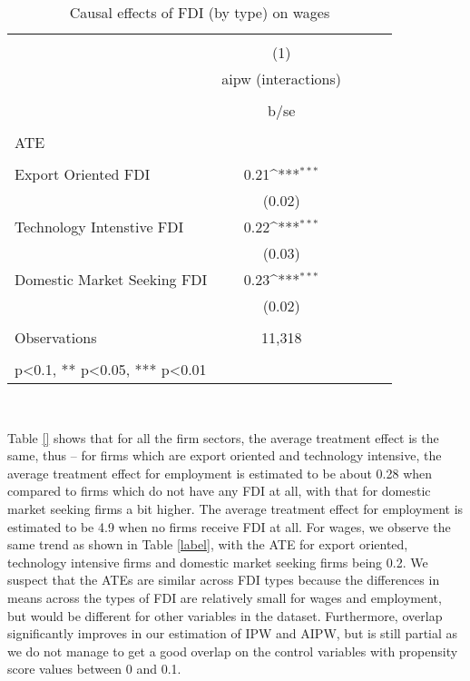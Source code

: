 \documentclass[11pt,a4paper,leqno]{article}
\begin{document}
\begin{table}
	\def\sym#1{\ifmmode^{#1}\else\(^{#1}\)\fi}
	\centering
	\caption{Causal effects of FDI (by type) on wages}
	\begin{tabular}{l*{1}{cccc}}
		\hline\hline
		&\multicolumn{1}{c}{}                                        \\
		& (1)   \\
		\
		&aipw (interactions)     \\
		\\
		&b/se       \\
		\hline
		\\
		ATE \\
		\\
		Export Oriented FDI &       0.21\sym{***}   \\
		&     (0.02)        \\
		Technology Intenstive FDI&       0.22\sym{***} \\
		&     (0.03)         \\
		Domestic Market Seeking FDI&       0.23\sym{***}\\
		&     (0.02)   \\
		\hline
		\\
		Observations        & 11,318          
		 &                 &            \\
		\hline\hline
		\\
		\small * p<0.1, ** p<0.05, *** p<0.01
	\end{tabular} \\
\end{table}


Table \ref{} shows that for all the firm sectors, the average treatment effect is the same, thus – for firms which are export oriented and technology intensive, the average treatment effect for employment is estimated to be about 0.28 when compared to firms which do not have any FDI at all, with that for domestic market seeking firms a bit higher. The average treatment effect for employment is estimated to be 4.9 when no firms receive FDI at all. For wages, we observe the same trend as shown in Table \ref{label}, with the ATE for export oriented,  technology intensive firms and domestic market seeking firms being 0.2. We suspect that the ATEs are similar across FDI types because the differences in means across the types of FDI are relatively small for wages and employment, but would be different for other variables in the dataset. Furthermore, overlap significantly improves in our estimation of IPW and AIPW, but is still partial as we do not manage to get a good overlap on the control variables with propensity score values between 0 and 0.1.
\end{document}
